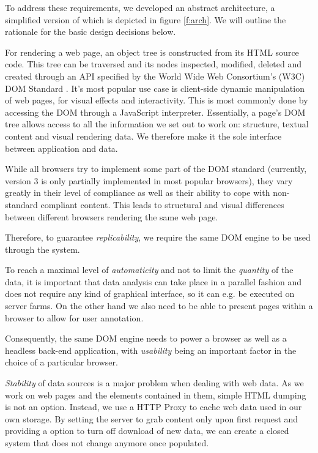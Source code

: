 To address these requirements, we developed an abstract architecture, a simplified version of which is depicted in figure \ref{f:arch}.
We will outline the rationale for the basic design decisions below.


For rendering a web page, an object tree is constructed from its HTML source code.
This tree can be traversed and its nodes inspected, modified, deleted and created through an API specified by the World Wide Web Consortium's (W3C) DOM Standard \cite{dom}.
It's most popular use case is client-side dynamic manipulation of web pages, for visual effects and interactivity.
This is most commonly done by accessing the DOM through a JavaScript interpreter.
Essentially, a page's DOM tree allows access to all the information we set out to work on: structure, textual content and visual rendering data.
We therefore make it the sole interface between application and data.

While all browsers try to implement some part of the DOM standard (currently, version 3 is only partially implemented in most popular browsers), they vary greatly in their level of compliance as well as their ability to cope with non-standard compliant content.
This leads to structural and visual differences between different browsers rendering the same web page.

Therefore, to guarantee \textit{replicability}, we require the same DOM engine to be used through the system.


To reach a maximal level of \textit{automaticity} and not to limit the \textit{quantity} of the data, it is important that data analysis can take place in a parallel fashion and does not require any kind of graphical interface, so it can e.g. be executed on server farms.
On the other hand we also need to be able to present pages within a browser to allow for user annotation.

Consequently, the same DOM engine needs to power a browser as well as a headless back-end application, with \textit{usability} being an important factor in the choice of a particular browser.


\textit{Stability} of data sources is a major problem when dealing with web data.
As we work on web pages and the elements contained in them, simple HTML dumping is not an option.
Instead, we use a HTTP Proxy to cache web data used in our own storage.
By setting the server to grab content only upon first request and providing a option to turn off download of new data, we can create a closed system that does not change anymore once populated.


